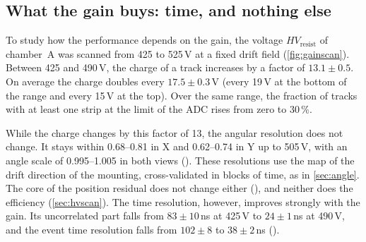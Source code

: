 \subsection{What the gain buys: time, and nothing else}\label{sec:gain}
To study how the performance depends on the gain, the voltage $HV_\mathrm{resist}$ of chamber~A was scanned from
425 to 525\,V at a fixed drift field (\cref{fig:gainscan}). Between 425 and 490\,V, the charge of a track increases
by a factor of $13.1\pm0.5$. On average the charge doubles every $17.5\pm0.3$\,V (every 19\,V at the bottom of the
range and every 15\,V at the top). Over the same range, the fraction of tracks with at least one strip at the limit
of the ADC rises from zero to 30\,\%.

While the charge changes by this factor of 13, the angular resolution does not change. It stays within
0.68--0.81\textdegree{} in X and 0.62--0.74\textdegree{} in Y up to 505\,V, with an angle scale of 0.995--1.005 in both
views (). These resolutions use the map of the drift direction of the mounting, cross-validated
in blocks of time, as in \cref{sec:angle}. The core of the position residual does not change either
(), and neither does the efficiency (\cref{sec:hvscan}). The time resolution, however,
improves strongly with the gain. Its uncorrelated part falls from $83\pm10$\,ns at 425\,V to $24\pm1$\,ns at 490\,V,
and the event time resolution falls from $102\pm8$ to $38\pm2$\,ns ().


